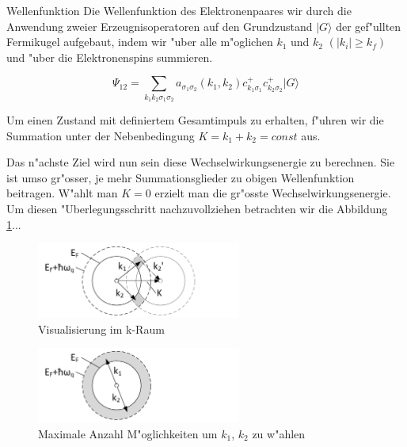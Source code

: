 \begin{refsection}
Wellenfunktion
Die Wellenfunktion des Elektronenpaares wir durch die Anwendung zweier Erzeugnisoperatoren auf den Grundzustand $|G\rangle$ der gef"ullten Fermikugel aufgebaut, indem wir "uber alle m"oglichen $k_1$ und $k_2$ $(|k_i| \ge k_f)$ und "uber die Elektronenspins summieren.

\begin{equation}
\Psi_{12}=\sum \limits_{k_1k_2\sigma_1\sigma_2} a_{\sigma_1\sigma_2}(k_1,k_2)c^+_{k_1\sigma_1}c^+_{k_2\sigma_2}|G\rangle
\label{supraleitung:Wellenfunktion ganz Allgemein}
\end{equation}

Um einen Zustand mit definiertem Gesamtimpuls zu erhalten, f"uhren wir die Summation unter der Nebenbedingung $K=k_1+k_2=const$ aus.

Das n"achste Ziel wird nun sein diese Wechselwirkungsenergie zu berechnen. Sie ist umso gr"osser, je mehr Summationsglieder zu obigen Wellenfunktion beitragen. W"ahlt man $K=0$ erzielt man die gr"osste Wechselwirkungsenergie. Um diesen "Uberlegungsschritt nachzuvollziehen betrachten wir die Abbildung \ref{supraleitung:kRaum_1}...
\\
\begin{figure}	
\centering
\includegraphics[width=0.6\textwidth]{supraleitung/kGraphic_05.png} %
\caption{Visualisierung im k-Raum
\label{supraleitung:kRaum_1}}
\end{figure}
\begin{figure}	
\centering
\includegraphics[width=0.6\textwidth]{supraleitung/kGraphic_09.png} %
\caption{Maximale Anzahl M"oglichkeiten um $k_1$, $k_2$ zu w"ahlen
\label{supraleitung:kRaum_2}}
\end{figure}


\end{refsection}
